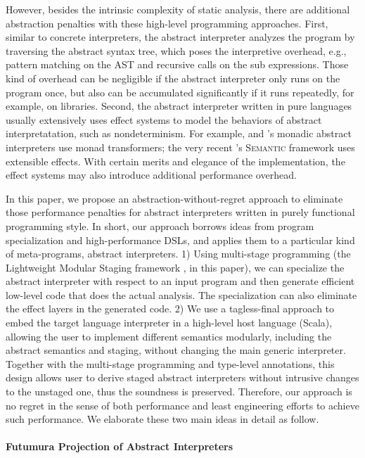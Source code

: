 However, besides the intrinsic complexity of static analysis, there are
additional abstraction penalties with these high-level programming approaches.
First, similar to concrete interpreters, the abstract interpreter analyzes the
program by traversing the abstract syntax tree, which poses the interpretive
overhead, e.g., pattern matching on the AST and recursive calls on the sub
expressions. Those kind of overhead can be negligible if the abstract
interpreter only runs on the program once, but also can be accumulated
significantly if it runs repeatedly, for example, on libraries. Second, the
abstract interpreter written in pure languages usually extensively uses effect
systems to model the behaviors of abstract interpretatation, such as
nondeterminism. For example, \citet{DBLP:journals/pacmpl/DaraisLNH17} and
\citet{Sergey:2013:MAI:2491956.2491979}'s monadic abstract interpreters use
monad transformers; the very recent \citet{Githubsemantic}'s \textsc{Semantic} framework
uses extensible effects. With certain merits and elegance of the implementation,
the effect systems may also introduce additional performance overhead.

In this paper, we propose an abstraction-without-regret approach to
eliminate those performance penalties for abstract interpreters
written in purely functional programming style. In short, our approach
borrows ideas from program specialization and high-performance DSLs,
and applies them to a particular kind of meta-programs, abstract
interpreters.
1) Using multi-stage programming (the Lightweight Modular Staging
framework \cite{DBLP:conf/gpce/RompfO10}, in this paper), we can
specialize the abstract interpreter with respect to an input program
and then generate efficient low-level code that does the actual
analysis. The specialization can also eliminate the effect layers in the generated code.
2) We use a tagless-final approach to embed the target
language interpreter in a high-level host language (Scala), allowing
the user to implement different semantics modularly, including the
abstract semantics and staging, without changing the main generic
interpreter. Together with the multi-stage programming and type-level
annotations, this design allows user to derive staged abstract
interpreters without intrusive changes to the unstaged one, thus the soundness is preserved. 
Therefore, our approach is no regret in the sense of both performance and least
engineering efforts to achieve such performance. We elaborate these
two main ideas in detail as follow.

\paragraph{Futumura Projection of Abstract Interpreters}

